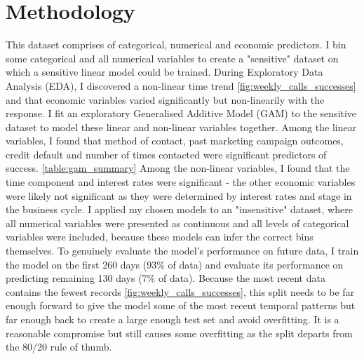 \documentclass[9pt]{article}
\begin{document}
\vspace{-0.25cm}
\section{Methodology}
\vspace{-0.25cm}
This dataset comprises of categorical, numerical and economic predictors. I bin some categorical and all numerical variables to create a "sensitive" dataset on which a sensitive linear model could be trained. During Exploratory Data Analysis (EDA), I discovered a non-linear time trend \ref{fig:weekly_calls_successes} and that economic variables varied significantly but non-linearily with the response. I fit an exploratory Generalised Additive Model (GAM) to the sensitive dataset to model these linear and non-linear variables together. Among the linear variables, I found that method of contact, past marketing campaign outcomes, credit default and number of times contacted were significant predictors of success. \ref{table:gam_summary} Among the non-linear variables, I found that the time component and interest rates were significant - the other economic variables were likely not significant as they were determined by interest rates and stage in the business cycle. I applied my chosen models to an "insensitive" dataset, where all numerical variables were presented as continuous and all levels of categorical variables were included, because these models can infer the correct bins themselves. To genuinely evaluate the model's performance on future data, I train the model on the first 260 days (93\% of data) and evaluate its performance on predicting remaining 130 days (7\% of data). Because the most recent data contains the fewest records \ref{fig:weekly_calls_successes}, this split needs to be far enough forward to give the model some of the most recent temporal patterns but far enough back to create a large enough test set and avoid overfitting. It is a reasonable compromise but still causes some overfitting as the split departs from the 80/20 rule of thumb.
\end{document}

